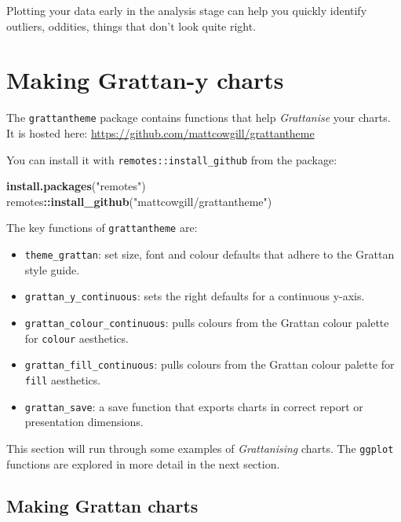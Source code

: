 \documentclass[]{book}
\newenvironment{Shaded}{\begin{snugshade}}{\end{snugshade}}
\newcommand{\KeywordTok}[1]{\textcolor[rgb]{0.13,0.29,0.53}{\textbf{#1}}}
\newcommand{\NormalTok}[1]{#1}
\newcommand{\OperatorTok}[1]{\textcolor[rgb]{0.81,0.36,0.00}{\textbf{#1}}}
\newcommand{\StringTok}[1]{\textcolor[rgb]{0.31,0.60,0.02}{#1}}
\providecommand{\tightlist}{%
  \setlength{\itemsep}{0pt}\setlength{\parskip}{0pt}}
\begin{document}
Plotting your data early in the analysis stage can help you quickly identify outliers, oddities, things that don't look quite right.

\hypertarget{making-grattan-y-charts}{%
\section{Making Grattan-y charts}\label{making-grattan-y-charts}}

The \texttt{grattantheme} package contains functions that help \emph{Grattanise} your charts. It is hosted here: \url{https://github.com/mattcowgill/grattantheme}

You can install it with \texttt{remotes::install\_github} from the package:

\begin{Shaded}
\begin{Highlighting}[]
\KeywordTok{install.packages}\NormalTok{(}\StringTok{"remotes"}\NormalTok{)}
\NormalTok{remotes}\OperatorTok{::}\KeywordTok{install_github}\NormalTok{(}\StringTok{"mattcowgill/grattantheme"}\NormalTok{)}
\end{Highlighting}
\end{Shaded}

The key functions of \texttt{grattantheme} are:

\begin{itemize}
\tightlist
\item
  \texttt{theme\_grattan}: set size, font and colour defaults that adhere to the Grattan style guide.
\item
  \texttt{grattan\_y\_continuous}: sets the right defaults for a continuous y-axis.
\item
  \texttt{grattan\_colour\_continuous}: pulls colours from the Grattan colour palette for \texttt{colour} aesthetics.
\item
  \texttt{grattan\_fill\_continuous}: pulls colours from the Grattan colour palette for \texttt{fill} aesthetics.
\item
  \texttt{grattan\_save}: a save function that exports charts in correct report or presentation dimensions.
\end{itemize}

This section will run through some examples of \emph{Grattanising} charts. The \texttt{ggplot} functions are explored in more detail in the next section.

\hypertarget{making-grattan-charts}{%
\subsection{Making Grattan charts}\label{making-grattan-charts}}
\end{document}
